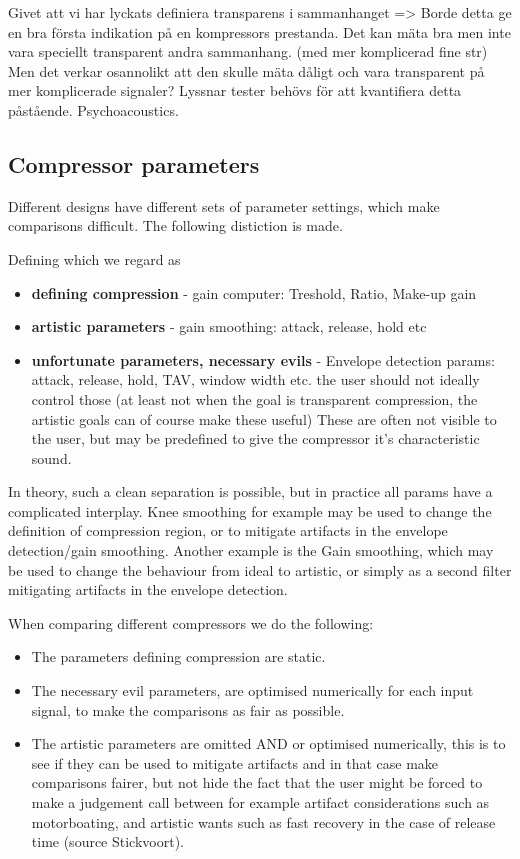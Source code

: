 \documentclass[../main2.tex]{subfiles}
\begin{document}
Givet att vi har lyckats definiera transparens i sammanhanget => Borde detta ge en bra första indikation på en kompressors prestanda.
Det kan mäta bra men inte vara speciellt transparent andra sammanhang. (med mer komplicerad fine str) Men det verkar osannolikt att den skulle mäta dåligt och vara transparent på mer komplicerade signaler? Lyssnar tester behövs för att kvantifiera detta påstående. Psychoacoustics.


\subsection{Compressor parameters}
Different designs have different sets of parameter settings, which make comparisons difficult. The following distiction is made. 

Defining which we regard as 
\begin{itemize}
\item \textbf{defining compression} - gain computer: Treshold, Ratio, Make-up gain
\item \textbf{artistic parameters} - gain smoothing: attack, release, hold etc
\item \textbf{unfortunate parameters, necessary evils} - Envelope detection params: attack, release, hold, TAV, window width etc. the user should not ideally control those (at least not when the goal is transparent compression, the artistic goals can of course make these useful) These are often not visible to the user, but may be predefined to give the compressor it's characteristic sound.
\end{itemize}

In theory, such a clean separation is possible, but in practice all params have a complicated interplay. Knee smoothing for example may be used to change the definition of compression region, or to mitigate artifacts in the envelope detection/gain smoothing.
Another example is the Gain smoothing, which may be used to change the behaviour from ideal to artistic, or simply as a second filter mitigating artifacts in the envelope detection.

When comparing different compressors we do the following:
\begin{itemize}
\item The parameters defining compression are static. 
\item The necessary evil parameters, are optimised numerically for each input signal, to make the comparisons as fair as possible.
\item The artistic parameters are omitted AND or optimised numerically, this is to see if they can be used to mitigate artifacts and in that case make comparisons fairer, but not hide the fact that the user might be forced to make a judgement call between for example artifact considerations such as motorboating, and artistic wants such as fast recovery in the case of release time (source Stickvoort).
\end{itemize}
\end{document}
